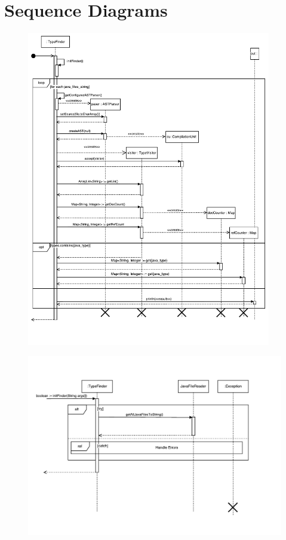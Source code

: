 \documentclass[12p]{article}
\begin{document}
\section{Sequence Diagrams}
\begin{figure}[H]
  \includegraphics[width=0.95\textwidth]{mainTypeFinder.pdf}
  \caption{} %
  \label{fig:sequence1}
\end{figure}

\begin{figure}
  \includegraphics[width=1.0\textwidth]{initFrinder.pdf}
  \caption{} %
  \label{fig:sequence2}
\end{figure}
\end{document}

